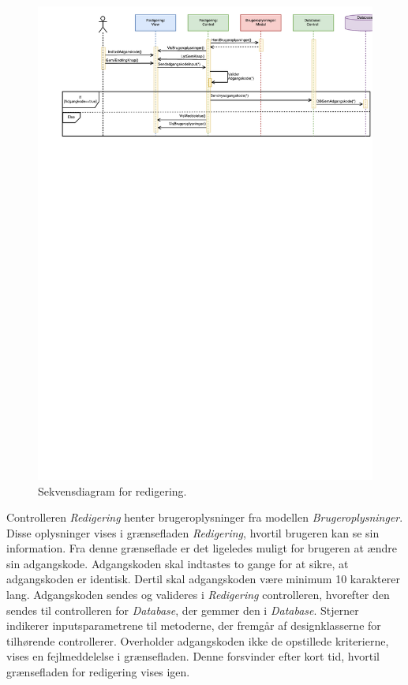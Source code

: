 \begin{figure} [H]
\centering
\includegraphics[width=1\textwidth]{figures/Sek/SEKRedigering}
\caption{Sekvensdiagram for redigering.}
\label{fig:SEKRedigering}
\end{figure}

\noindent
Controlleren \textit{Redigering} henter brugeroplysninger fra modellen \textit{Brugeroplysninger}. Disse oplysninger vises i grænsefladen \textit{Redigering}, hvortil brugeren kan se sin information. Fra denne grænseflade er det ligeledes muligt for brugeren at ændre sin adgangskode. Adgangskoden skal indtastes to gange for at sikre, at adgangskoden er identisk. Dertil skal adgangskoden være minimum 10 karakterer lang. Adgangskoden sendes og valideres i \textit{Redigering} controlleren, hvorefter den sendes til controlleren for \textit{Database}, der gemmer den i \textit{Database}. Stjerner indikerer inputsparametrene til metoderne, der fremgår af designklasserne for tilhørende controllerer. Overholder adgangskoden ikke de opstillede kriterierne, vises en fejlmeddelelse i grænsefladen. Denne forsvinder efter kort tid, hvortil grænsefladen for redigering vises igen. 
